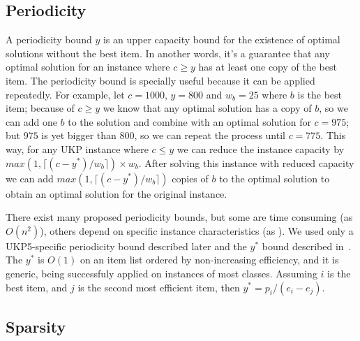 \documentclass[runningheads,a4paper]{llncs}
\begin{document}



\subsection{Periodicity}

A periodicity bound \(y\) is an upper capacity bound for the existence of optimal solutions without the best item. 
In another words, it's a guarantee that any optimal solution for an instance where \(c \geq y\) has at least one copy of the best item. 
The periodicity bound is specially useful because it can be applied repeatedly. 
For example, let \(c = 1000\), \(y = 800\) and \(w_b = 25\) where \(b\) is the best item; because of \(c \geq y\) we know that any optimal solution has a copy of \(b\), so we can add one \(b\) to the solution and combine with an optimal solution for \(c = 975\); but \(975\) is yet bigger than \(800\), so we can repeat the process until \(c = 775\). 
This way, for any UKP instance where \(c \leq y\) we can reduce the instance capacity by \(max(1, \lceil(c-y^{*})/w_b\rceil)\times w_b\). After solving this instance with reduced capacity we can add \(max(1, \lceil(c-y^{*})/w_b\rceil)\) copies of \(b\) to the optimal solution to obtain an optimal solution for the original instance.

There exist many proposed periodicity bounds, but some are time consuming (as \(O(n^2)\)\cite{badbound1}), others depend on specific instance characteristics (as \cite{badbound2}\cite{pya}).
We used only a UKP5-specific periodicity bound described later and the \(y^{*}\) bound described in~\cite[p. 223]{gar72}.
The \(y^*\) is \(O(1)\) on an item list ordered by non-increasing efficiency,  and it is generic, being successfuly applied on instances of most classes.
Assuming \(i\) is the best item, and \(j\) is the second most efficient item, then \mbox{\(y^{*} = p_i / (e_i - e_j)\)}.

\subsection{Sparsity}
\end{document}
